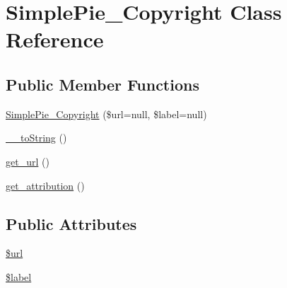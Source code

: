 \hypertarget{class_simple_pie___copyright}{\section{Simple\-Pie\-\_\-\-Copyright Class Reference}
\label{class_simple_pie___copyright}
}
\subsection*{Public Member Functions}
\begin{DoxyCompactItemize}
\item 
\hyperlink{class_simple_pie___copyright_a436eba28ad30250453388612dd6b8dac}{Simple\-Pie\-\_\-\-Copyright} (\$url=null, \$label=null)
\item 
\hyperlink{class_simple_pie___copyright_ae1c4755fee9efa821f4488881e008534}{\-\_\-\-\_\-to\-String} ()
\item 
\hyperlink{class_simple_pie___copyright_a53d8ff7ef9766c36f89782086d3ae71c}{get\-\_\-url} ()
\item 
\hyperlink{class_simple_pie___copyright_af2186deb04adc6867ba4bfc6df51db3f}{get\-\_\-attribution} ()
\end{DoxyCompactItemize}
\subsection*{Public Attributes}
\begin{DoxyCompactItemize}
\item 
\hyperlink{class_simple_pie___copyright_a220d862e221dfe8441e08f9fadb571e1}{\$url}
\item 
\hyperlink{class_simple_pie___copyright_a88300d777a88e17fd9a0ef9060fee2e3}{\$label}
\end{DoxyCompactItemize}


